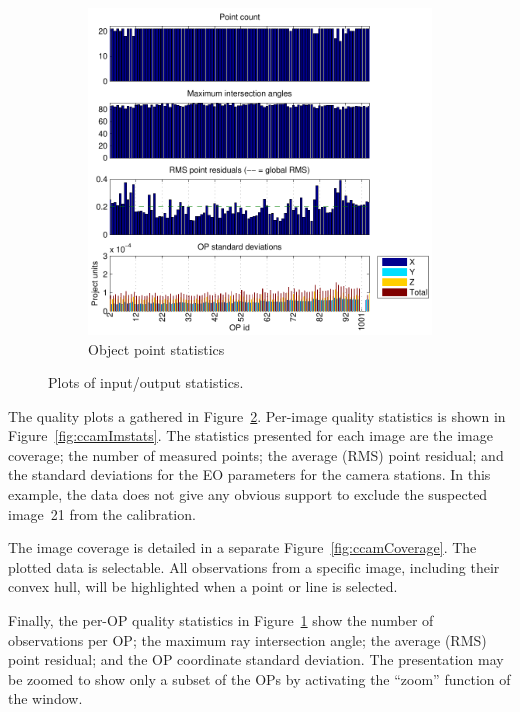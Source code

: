 \documentclass{article}
\begin{document}
\begin{figure}
\begin{subfigure}[b]{0.3\textwidth}
    \includegraphics[width=\textwidth]{ill/ccamopstats}
    \caption{Object point statistics}
    \label{fig:ccamOPstats}
  \end{subfigure}
  \caption{Plots of input/output statistics.}\label{fig:ccamQuality}
\end{figure}

The quality plots a gathered in Figure~\ref{fig:ccamQuality}.
Per-image quality statistics is shown in Figure~\ref{fig:ccamImstats}.
The statistics presented for each image are the image coverage; the
number of measured points; the average (RMS) point residual; and the
standard deviations for the EO parameters for the camera stations. In
this example, the data does not give any obvious support to exclude
the suspected image~21 from the calibration.

The image coverage is detailed in a separate
Figure~\ref{fig:ccamCoverage}. The plotted data is selectable. All
observations from a specific image, including their convex hull, will
be highlighted when a point or line is selected.

Finally, the per-OP quality statistics in Figure~\ref{fig:ccamOPstats}
show the number of observations per OP; the maximum ray intersection
angle; the average (RMS) point residual; and the OP coordinate
standard deviation. The presentation may be zoomed to show only a
subset of the OPs by activating the ``zoom'' function of the window.
\end{document}
